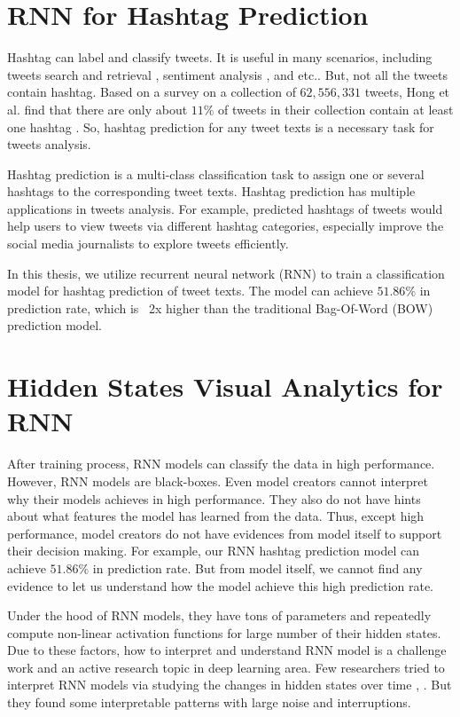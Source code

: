 \section{RNN for Hashtag Prediction}

Hashtag can label and classify tweets. It is useful in many scenarios, including tweets search and retrieval \cite{Efron2010}, sentiment analysis \cite{Davidov2010}, and etc.. But, not all the tweets contain hashtag. Based on a survey on a collection of $62,556,331$ tweets, Hong et al. find that there are only about $11\%$ of tweets in their collection contain at least one hashtag \cite{Hong2011a}. So, hashtag prediction for any tweet texts is a necessary task for tweets analysis. 

Hashtag prediction is a multi-class classification task to assign one or several hashtags to the corresponding tweet texts. Hashtag prediction has multiple applications in tweets analysis.  For example, predicted hashtags of tweets would help users to view tweets via different hashtag categories, especially improve the social media journalists to explore tweets efficiently. 

In this thesis, we utilize recurrent neural network (RNN) to train a classification model for hashtag prediction of tweet texts. The model can achieve $51.86\%$ in prediction rate, which is ~2x higher than the traditional Bag-Of-Word (BOW) prediction model.

\section{Hidden States Visual Analytics for RNN}

After training process, RNN models can classify the data in high performance. However, RNN models are black-boxes. Even model creators cannot interpret why their models achieves in high performance. They also do not have hints about what features the model has learned from the data. Thus, except high performance, model creators do not have evidences from model itself to support their decision making.  For example, our RNN hashtag prediction model can achieve $51.86\%$ in prediction rate. But from model itself, we cannot find any evidence to let us understand how the model achieve this high prediction rate. 

Under the hood of RNN models, they have tons of parameters and repeatedly compute non-linear activation functions for large number of their hidden states. Due to these factors, how to interpret and understand RNN model is a challenge work and an active research topic in deep learning area. Few researchers tried to interpret RNN models via studying the changes in hidden states over time \cite{Strobelt2016} \cite{Li2016}, . But they found some interpretable patterns with large noise and interruptions. 


